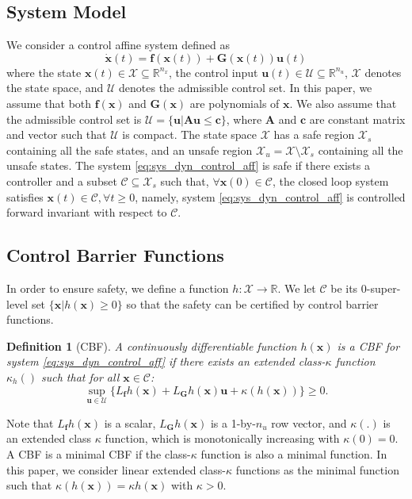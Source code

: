 \documentclass[letterpaper, 10 pt, conference]{ieeeconf}  %
\newtheorem{definition}{Definition}
\begin{document}
\subsection{System Model}
We consider a control affine system defined as
\begin{equation}
\label{eq:sys_dyn_control_aff}
    \Dot{\mathbf{x}}(t) = \mathbf{f}(\mathbf{x}(t)) + \mathbf{G}(\mathbf{x}(t))\mathbf{u}(t)
\end{equation}
where the state $\mathbf{x}(t)\in\mathcal{X}\subseteq\mathbb{R}^{n_x}$, the control input $\mathbf{u}(t)\in\mathcal{U}\subseteq\mathbb{R}^{n_u}$, $\mathcal{X}$ denotes the state space, and $\mathcal{U}$ denotes the admissible control set. In this paper, we assume that both $\mathbf{f}(\mathbf{x})$ and $\mathbf{G}(\mathbf{x})$ are polynomials of $\mathbf{x}$. We also assume that the admissible control set is $\mathcal{U}=\{\mathbf{u}|\mathbf{A}\mathbf{u}\leq\mathbf{c}\}$, where $\mathbf{A}$ and $\mathbf{c}$ are constant matrix and vector such that $\mathcal{U}$ is compact. The state space $\mathcal{X}$ has a safe region $\mathcal{X}_s$ containing all the safe states, and an unsafe region $\mathcal{X}_u = \mathcal{X}\setminus\mathcal{X}_s$ containing all the unsafe states. The system \eqref{eq:sys_dyn_control_aff} is safe if there exists a controller and a subset $\mathcal{C}\subseteq\mathcal{X}_s$ such that, $\forall \mathbf{x}(0) \in \mathcal{C}$, the closed loop system satisfies $\mathbf{x}(t)\in\mathcal{C}, \forall t\geq 0$, namely, system \eqref{eq:sys_dyn_control_aff} is controlled forward invariant with respect to $\mathcal{C}$.

\subsection{Control Barrier Functions}
In order to ensure safety, we define a function $h:\mathcal{X}\rightarrow\mathbb{R}$. We let $\mathcal{C}$ be its 0-super-level set $\{\mathbf{x}|h(\mathbf{x})\geq 0\}$ so that the safety can be certified by control barrier functions.
\begin{definition}[CBF\cite{ames2019control}]
\label{def:cbf}
A continuously differentiable function $h(\mathbf{x})$ is a CBF for system \eqref{eq:sys_dyn_control_aff} if there exists an extended class-$\kappa$ function $\kappa_h( )$ such that for all $\mathbf{x}\in\mathcal{C}$:
\begin{equation}
\label{eq:def_cbf}
    \sup_{\mathbf{u}\in \mathcal{U}}\{L_{\mathbf{f}}h(\mathbf{x})+L_{\mathbf{G}}h(\mathbf{x})\mathbf{u}+\kappa(h(\mathbf{x}))\}\geq 0.
\end{equation}
\end{definition}
Note that $L_{\mathbf{f}}h(\mathbf{x})$ is a scalar, $L_{\mathbf{G}}h(\mathbf{x})$ is a 1-by-$n_u$ row vector, and $\kappa(.)$ is an extended class $\kappa$ function, which is monotonically increasing with $\kappa(0)=0$. A CBF is a minimal CBF \cite{konda2020characterizing} if the class-$\kappa$ function is also a minimal function\cite[Theorem 2]{konda2020characterizing}. In this paper, we consider linear extended class-$\kappa$ functions as the minimal function such that $\kappa(h(\mathbf{x}))=\kappa h(\mathbf{x})$ with $\kappa>0$. 
\end{document}
